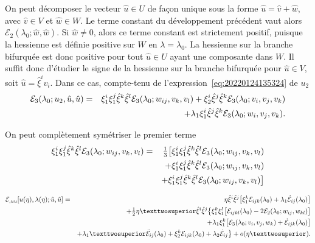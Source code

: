 \documentclass[12pt, final]{amsart}
\begin{document}
On peut décomposer le vecteur \(\hat{u}\in U\) de façon unique sous la forme
\(\hat{u}=\hat{v}+\hat{w}\), avec \(\hat{v}\in V\) et \(\hat{w}\in W\). Le terme
constant du développement précédent vaut alors \(\mathcal E_2(\lambda _0; \hat{w}, \hat{w})\). Si
\(\hat{w}\neq0\), alors ce terme constant est strictement positif, puisque la
hessienne est définie positive sur \(W\) en \(\lambda =\lambda _0\). La hessienne sur la
branche bifurquée est donc positive pour tout \(\hat{u}\in U\) ayant une
composante dans \(W\). Il suffit donc d'étudier le signe de la hessienne sur la
branche bifurquée pour \(\hat{u}\in V\), soit \(\hat{u}=\hat{\xi }^iv_i\). Dans ce
cas, compte-tenu de l'expression~\eqref{eq:20220124135324} de \(u_2\)
\begin{eqnarray}
  \notag
  \mathcal E_3(\lambda _0; u_2, \hat{u}, \hat{u})
  &=&\xi _1^i\xi _1^j\hat{\xi }^k\hat{\xi }^l\mathcal E_3(\lambda _0; w_{ij}, v_k, v_l)
      +\xi _2^i\hat{\xi }^j\hat{\xi }^k\mathcal E_3(\lambda _0; v_i, v_j, v_k)\\
  &&+\lambda _1\xi _1^i\hat{\xi }^j\hat{\xi }^k\mathcal E_3(\lambda _0; w_i, v_j, v_k).
\end{eqnarray}

On peut complètement symétriser le premier terme
\begin{eqnarray}
  \notag
  \xi _1^i\xi _1^j\hat{\xi }^k\hat{\xi }^l\mathcal E_3(\lambda _0; w_{ij}, v_k, v_l)
  &=&\tfrac13\bigl[\xi _1^i\xi _1^j\hat{\xi }^k\hat{\xi }^l\mathcal E_3(\lambda _0; w_{ij}, v_k, v_l)\\
  \notag
  &&+\xi _1^i\xi _1^j\hat{\xi }^k\hat{\xi }^l\mathcal E_3(\lambda _0; w_{ij}, v_k, v_l)\\
  &&+\xi _1^i\xi _1^j\hat{\xi }^k\hat{\xi }^l\mathcal E_3(\lambda _0; w_{ij}, v_k, v_l)\bigr]
\end{eqnarray}

\begin{eqnarray}
  \notag
  \mathcal E_{,uu}[u(\eta ), \lambda (\eta ); \hat{u}, \hat{u}]
  &=&\eta \hat{\xi }^i\hat{\xi }^j\bigl[\xi _1^k\mathcal E_{ijk}(\lambda _0)+\lambda _1\dot{\mathcal E}_{ij}(\lambda _0)\bigr]\\
  \notag
  &&+\tfrac12\eta ²\hat{\xi }^i\hat{\xi }^j\bigl\{\xi _1^k\xi _1^l\bigl[\mathcal E_{ijkl}(\lambda _0)
     -2\mathcal E_2(\lambda _0; w_{ij}, w_{kl})\bigr]\\
  \notag
  &&+\lambda _1\xi _1^k\bigl[\mathcal E_3(\lambda _0; v_i, v_j, w_k)+\dot{\mathcal E}_{ijk}(\lambda _0)\bigr]\\
  \label{eq:20220203144500}
  &&+\lambda _1²\ddot{\mathcal E}_{ij}(\lambda _0)+\xi _2^k\mathcal E_{ijk}(\lambda _0)+\lambda _2\dot{\mathcal E}_{ij}\bigr\}+o(\eta ²).
\end{eqnarray}
\end{document}
